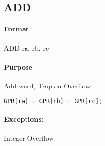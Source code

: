 \subsection{ADD}


\paragraph{Format} ADD ra, rb, rc

\paragraph{Purpose} Add word, Trap on Overflow

\begin{lstlisting}[language=C]
    GPR[ra] = GPR[rb] + GPR[rc];
\end{lstlisting}

\paragraph{Exceptions:} Integer Overflow
